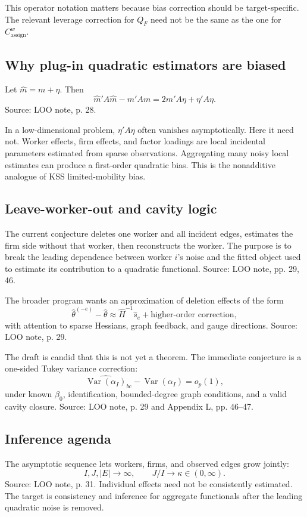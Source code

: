 \documentclass[11pt]{article}
\newcommand{\Var}{\operatorname{Var}}
\begin{document}
This operator notation matters because bias correction should be target-specific.
The relevant leverage correction for \(Q_F\) need not be the same as the one for
\(C^w_{\mathrm{assign}}\).

\subsection{Why plug-in quadratic estimators are biased}

Let \(\hat m=m+\eta\). Then
\[
\hat m'A\hat m-m'Am
=
2m'A\eta+\eta'A\eta.
\]
Source: LOO note, p. 28.

In a low-dimensional problem, \(\eta'A\eta\) often vanishes asymptotically. Here
it need not. Worker effects, firm effects, and factor loadings are local
incidental parameters estimated from sparse observations. Aggregating many noisy
local estimates can produce a first-order quadratic bias. This is the
nonadditive analogue of KSS limited-mobility bias.

\subsection{Leave-worker-out and cavity logic}

The current conjecture deletes one worker and all incident edges, estimates the
firm side without that worker, then reconstructs the worker. The purpose is to
break the leading dependence between worker \(i\)'s noise and the fitted object
used to estimate its contribution to a quadratic functional. Source: LOO note,
pp. 29, 46.

The broader program wants an approximation of deletion effects of the form
\[
\hat\theta^{(-e)}-\hat\theta
\approx
\hat H^{-1}\hat s_e
+\text{higher-order correction},
\]
with attention to sparse Hessians, graph feedback, and gauge directions. Source:
LOO note, p. 29.

The draft is candid that this is not yet a theorem. The immediate conjecture is
a one-sided Tukey variance correction:
\[
\widehat{\Var(\alpha_I)}_{bc}-\Var(\alpha_I)=o_p(1),
\]
under known \(\beta_0\), identification, bounded-degree graph conditions, and a
valid cavity closure. Source: LOO note, p. 29 and Appendix L, pp. 46--47.

\subsection{Inference agenda}

The asymptotic sequence lets workers, firms, and observed edges grow jointly:
\[
I,J,|E|\to\infty,\qquad J/I\to\kappa\in(0,\infty).
\]
Source: LOO note, p. 31. Individual effects need not be consistently estimated.
The target is consistency and inference for aggregate functionals after the
leading quadratic noise is removed.
\end{document}
